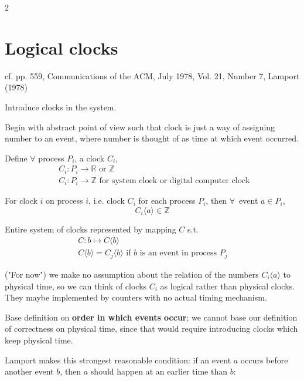 \documentclass[10pt]{amsart}
\begin{document}
\begin{multicols*}{2}
\section{Logical clocks}

cf. pp. 559, Communications of the ACM, July 1978, Vol. 21, Number 7, Lamport (1978) \cite{Lamp1978}

Introduce clocks in the system.

Begin with abstract point of view such that clock is just a way of assigning number to an event, where number is thought of as time at which event occurred. 

Define $\forall $ process $P_i$, a clock $C_i$, 
\begin{equation}
\begin{aligned}
	& C_i : P_i \to \mathbb{R} \text{ or } \mathbb{Z} \\ 
	& C_i: P_i \to \mathbb{Z} \text{ for system clock or digital computer clock }
\end{aligned}
\end{equation}

For clock $i$ on process $i$, i.e. clock $C_i$ for each process $P_i$, then $\forall \, $ event $a\in P_i$, 
\begin{equation}
C_i\langle a \rangle \in \mathbb{Z}
\end{equation}

Entire system of clocks represented by mapping $C$ s.t. 
\begin{equation}
\begin{aligned}
& C: b \mapsto C \langle b \rangle \\
& C\langle b \rangle = C_j\langle b \rangle \text{ if $b$ is an event in process $P_j$ }
\end{aligned}
\end{equation}

("For now") we make no assumption about the relation of the numbers $C_i\langle a \rangle$ to physical time, so we can think of clocks $C_i$ as logical rather than physical clocks. They maybe implemented by counters with no actual timing mechanism.

Base definition on \textbf{order in which events occur}; we cannot base our definition of correctness on physical time, since that would require introducing clocks which keep physical time.

Lamport makes this strongest reasonable condition: if an event $a$ occurs before another event $b$, then $a$ should happen at an earlier time than $b$:


\end{multicols*}
\end{document}
